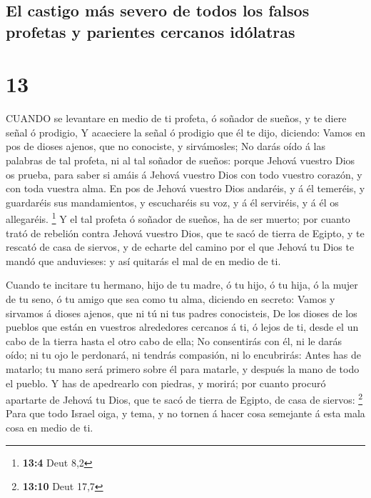 \hypertarget{el-castigo-muxe1s-severo-de-todos-los-falsos-profetas-y-parientes-cercanos-iduxf3latras}{%
\subsection{El castigo más severo de todos los falsos profetas y
parientes cercanos
idólatras}\label{el-castigo-muxe1s-severo-de-todos-los-falsos-profetas-y-parientes-cercanos-iduxf3latras}}

\hypertarget{section-12}{%
\section{13}\label{section-12}}

 CUANDO se levantare en medio de ti profeta, ó soñador de
sueños, y te diere señal ó prodigio,  Y acaeciere la señal ó
prodigio que él te dijo, diciendo: Vamos en pos de dioses ajenos, que no
conociste, y sirvámosles;  No darás oído á las palabras de
tal profeta, ni al tal soñador de sueños: porque Jehová vuestro Dios os
prueba, para saber si amáis á Jehová vuestro Dios con todo vuestro
corazón, y con toda vuestra alma.  En pos de Jehová vuestro
Dios andaréis, y á él temeréis, y guardaréis sus mandamientos, y
escucharéis su voz, y á él serviréis, y á él os allegaréis. \footnote{\textbf{13:4}
  Deut 8,2}  Y el tal profeta ó soñador de sueños, ha de ser
muerto; por cuanto trató de rebelión contra Jehová vuestro Dios, que te
sacó de tierra de Egipto, y te rescató de casa de siervos, y de echarte
del camino por el que Jehová tu Dios te mandó que anduvieses: y así
quitarás el mal de en medio de ti.

 Cuando te incitare tu hermano, hijo de tu madre, ó tu hijo,
ó tu hija, ó la mujer de tu seno, ó tu amigo que sea como tu alma,
diciendo en secreto: Vamos y sirvamos á dioses ajenos, que ni tú ni tus
padres conocisteis,  De los dioses de los pueblos que están
en vuestros alrededores cercanos á ti, ó lejos de ti, desde el un cabo
de la tierra hasta el otro cabo de ella;  No consentirás con
él, ni le darás oído; ni tu ojo le perdonará, ni tendrás compasión, ni
lo encubrirás:  Antes has de matarlo; tu mano será primero
sobre él para matarle, y después la mano de todo el pueblo.
 Y has de apedrearlo con piedras, y morirá; por cuanto
procuró apartarte de Jehová tu Dios, que te sacó de tierra de Egipto, de
casa de siervos: \footnote{\textbf{13:10} Deut 17,7}  Para
que todo Israel oiga, y tema, y no tornen á hacer cosa semejante á esta
mala cosa en medio de ti.

